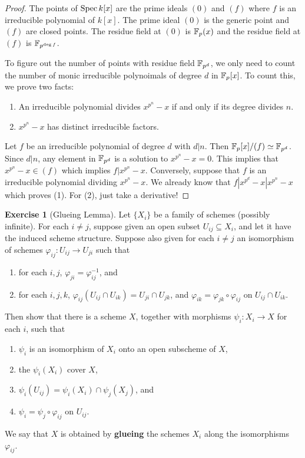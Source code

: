 \documentclass[]{pcmi}
\theoremstyle{plain}
\theoremstyle{definition}
\newtheorem{Exercise}[subsubsection]{Exercise}
\theoremstyle{remark}
\begin{document}
\begin{proof}
    The points of $\operatorname{Spec} k[x]$ are the prime ideals $(0)$ and $(f)$ where $f$ is an irreducible polynomial of $k[x]$. The prime ideal $(0)$ is the generic point and $(f)$ are closed points. The residue field at $(0)$ is $\mathbb{F}_p(x)$ and the residue field at $(f)$ is $\mathbb{F}_{p^{\deg f}}$. 
    
    To figure out the number of points with residue field $\mathbb{F}_{p^d}$, we only need to count the number of monic irreducible polynoimals of degree $d$ in $\mathbb{F}_p[x]$. To count this, we prove two facts:
    \begin{enumerate}
        \item An irreducible polynomial divides $x^{p^n} - x$ if and only if its degree divides $n$. 
        \item $x^{p^n} - x$ has distinct irreducible factors.
    \end{enumerate}
    Let $f$ be an irreducible polynomial of degree $d$ with $d | n$. Then $\mathbb{F}_p[x] / (f) \simeq \mathbb{F}_{p^d}$. Since $d | n$, any element in $\mathbb{F}_{p^d}$ is a solution to $x^{p^n} - x = 0$. This implies that $x^{p^n} - x \in (f)$ which implies $f | x^{p^n} - x$. Conversely, suppose that $f$ is an irreducible polynomial dividing $x^{p^n} - x$. We already know that $f | x^{p^d} - x | x^{p^n} - x$ which proves (1). For (2), just take a derivative!
\end{proof}

\begin{Exercise}[Glueing Lemma]
    Let $\{X_i\}$ be a family of schemes (possibly infinite). For each $i \neq j$, suppose given an open subset $U_{ij} \subseteq X_i$, and let it have the induced scheme structure. Suppose also given for each $i \neq j$ an isomorphism of schemes $\varphi_{ij} : U_{ij} \to U_{ji}$ such that 
    \begin{enumerate}
        \item for each $i, j$, $\varphi_{ji} = \varphi_{ij}^{-1}$, and 
        \item for each $i, j, k$, $\varphi_{ij}(U_{ij} \cap U_{ik}) = U_{ji} \cap U_{jk}$, and $\varphi_{ik} = \varphi_{jk} \circ \varphi_{ij}$ on $U_{ij} \cap U_{ik}$.
    \end{enumerate}
    Then show that there is a scheme $X$, together with morphisms $\psi_i : X_i \to X$ for each $i$, such that 
    \begin{enumerate}
        \item $\psi_i$ is an isomorphism of $X_i$ onto an open subscheme of $X$, 
        \item the $\psi_i(X_i)$ cover $X$, 
        \item $\psi_i(U_{ij}) = \psi_i(X_i) \cap \psi_j(X_j)$, and 
        \item $\psi_i = \psi_j \circ \varphi_{ij}$ on $U_{ij}$. 
    \end{enumerate}
    We say that $X$ is obtained by \textbf{glueing} the schemes $X_i$ along the isomorphisms $\varphi_{ij}$.
\end{Exercise}
\end{document}
